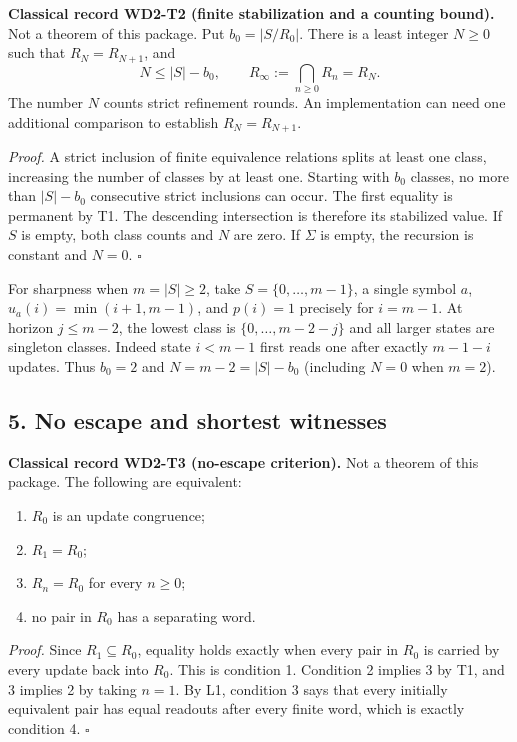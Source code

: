 \documentclass[
  11pt,
]{article}
\providecommand{\tightlist}{%
  \setlength{\itemsep}{0pt}\setlength{\parskip}{0pt}}
\begin{document}
\textbf{Classical record WD2-T2 (finite stabilization and a counting bound).} Not a theorem of this package. Put
\(b_0=|S/R_0|\). There is a least integer \(N\ge0\) such that
\(R_N=R_{N+1}\), and \[
 N\le |S|-b_0,\qquad R_\infty:=\bigcap_{n\ge0}R_n=R_N.
\] The number \(N\) counts strict refinement rounds. An implementation
can need one additional comparison to establish \(R_N=R_{N+1}\).

\emph{Proof.} A strict inclusion of finite equivalence relations splits
at least one class, increasing the number of classes by at least one.
Starting with \(b_0\) classes, no more than \(|S|-b_0\) consecutive
strict inclusions can occur. The first equality is permanent by T1. The
descending intersection is therefore its stabilized value. If \(S\) is
empty, both class counts and \(N\) are zero. If \(\Sigma\) is empty, the
recursion is constant and \(N=0\). \(\square\)

For sharpness when \(m=|S|\ge2\), take \(S=\{0,\ldots,m-1\}\), a single
symbol \(a\), \(u_a(i)=\min(i+1,m-1)\), and \(p(i)=1\) precisely for
\(i=m-1\). At horizon \(j\le m-2\), the lowest class is
\(\{0,\ldots,m-2-j\}\) and all larger states are singleton classes.
Indeed state \(i<m-1\) first reads one after exactly \(m-1-i\) updates.
Thus \(b_0=2\) and \(N=m-2=|S|-b_0\) (including \(N=0\) when \(m=2\)).

\subsection{5. No escape and shortest
witnesses}\label{no-escape-and-shortest-witnesses}

\textbf{Classical record WD2-T3 (no-escape criterion).} Not a theorem of this package. The following are
equivalent:

\begin{enumerate}
\def\labelenumi{\arabic{enumi}.}
\tightlist
\item
  \(R_0\) is an update congruence;
\item
  \(R_1=R_0\);
\item
  \(R_n=R_0\) for every \(n\ge0\);
\item
  no pair in \(R_0\) has a separating word.
\end{enumerate}

\emph{Proof.} Since \(R_1\subseteq R_0\), equality holds exactly when
every pair in \(R_0\) is carried by every update back into \(R_0\). This
is condition 1. Condition 2 implies 3 by T1, and 3 implies 2 by taking
\(n=1\). By L1, condition 3 says that every initially equivalent pair
has equal readouts after every finite word, which is exactly condition
4. \(\square\)
\end{document}
